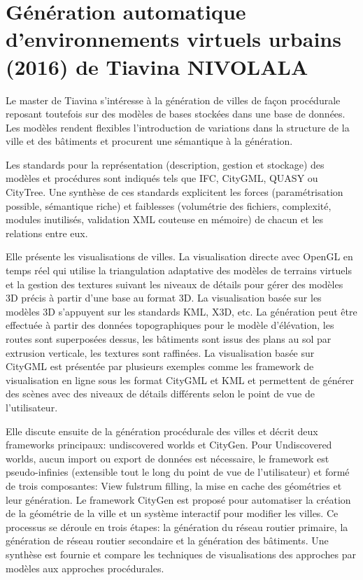 \documentclass[11pt]{article}
\begin{document}
\section*{Génération automatique d’environnements virtuels urbains (2016) de Tiavina NIVOLALA}

Le master de Tiavina s'intéresse à la génération de villes de façon procédurale reposant toutefois sur des modèles de bases stockées dans une base de données. Les modèles rendent flexibles l'introduction de variations dans la structure de la ville et des bâtiments et procurent une sémantique à la génération.

Les standards  pour la représentation (description, gestion et stockage) des modèles et procédures sont indiqués tels que IFC, CityGML, QUASY ou CityTree. Une synthèse de ces standards explicitent les forces (paramétrisation possible, sémantique riche) et faiblesses (volumétrie des fichiers, complexité, modules inutilisés, validation XML couteuse en mémoire) de chacun et les relations entre eux.

Elle présente les visualisations de villes. La visualisation directe avec OpenGL en temps réel qui utilise la triangulation adaptative des modèles de terrains virtuels et la gestion des textures suivant les niveaux de détails pour gérer des modèles 3D précis à partir d'une base au format 3D.
La visualisation basée sur les modèles 3D s'appuyent sur les standards KML, X3D, etc. La génération peut être effectuée à partir des données topographiques pour le modèle d'élévation, les routes sont superposées dessus, les bâtiments sont issus des plans au sol par extrusion verticale, les textures sont raffinées. 
La visualisation basée sur CityGML est présentée par plusieurs exemples comme les framework de visualisation en ligne sous les format CityGML et KML et permettent de générer des scènes avec des niveaux de détails différents selon le point de vue de l'utilisateur.

Elle discute ensuite de la génération procédurale des villes et décrit deux frameworks principaux: undiscovered worlds et CityGen. Pour Undiscovered worlds, aucun import ou export de données est nécessaire, le framework est pseudo-infinies (extensible tout le long du point de vue de l'utilisateur) et formé de trois composantes: View fulstrum filling, la mise en cache des géométries et leur génération. Le framework CityGen est proposé pour automatiser la création de la géométrie de la ville et un système interactif pour modifier les villes. Ce processus se déroule en trois étapes: la génération du réseau routier primaire, la génération de réseau routier secondaire et la génération des bâtiments. Une synthèse est fournie et compare les techniques de visualisations des approches par modèles aux approches procédurales.
\end{document}
